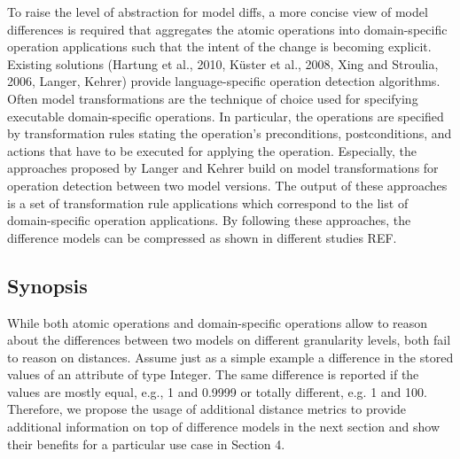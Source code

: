 To raise the level of abstraction for model diffs, a more concise view of model differences is required that aggregates the atomic operations into domain-specific operation applications such that the intent of the change is becoming explicit. Existing solutions (Hartung et al., 2010, Küster et al., 2008, Xing and Stroulia, 2006, Langer, Kehrer) provide language-specific operation detection algorithms. Often model transformations are the technique of choice used for specifying executable domain-specific operations. In particular, the operations are specified by transformation rules stating the operation's preconditions, postconditions, and actions that have to be executed for applying the operation. Especially, the approaches  proposed by Langer and Kehrer build on model transformations for operation detection between two model versions. The output of these approaches is a set of transformation rule applications which correspond to the list of domain-specific operation applications. By following these approaches, the difference models can be compressed as shown in different studies REF. 

\subsection{Synopsis}

While both atomic operations and domain-specific operations allow to reason about the differences between two models on different granularity levels, both fail to reason on distances. Assume just as a simple example a difference in the stored values of an attribute of type Integer. The same difference is reported if the values are mostly equal, e.g., 1 and 0.9999 or totally different, e.g. 1 and 100. Therefore, we propose the usage of additional distance metrics to provide additional information on top of difference models in the next section and show their benefits for a particular use case in Section 4.   